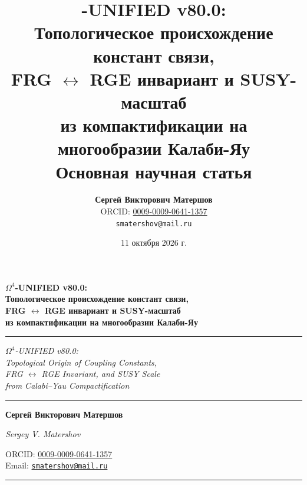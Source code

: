 \documentclass[11pt,a4paper]{article}
\title{
    \textbf{\Omtext-UNIFIED v80.0: \\[0.3em]
    Топологическое происхождение констант связи, \\
    FRG $\leftrightarrow$ RGE инвариант и SUSY-масштаб \\[0.3em]
    из компактификации на многообразии Калаби-Яу} \\[0.5em]
    \large Основная научная статья
}
\author{
    \textbf{Сергей Викторович Матершов} \\
    ORCID: \href{https://orcid.org/0009-0009-0641-1357}{0009-0009-0641-1357} \\
    \small \texttt{smatershov@mail.ru}
}
\date{11 октября 2026 г.}
\theoremstyle{definition}
\begin{document}

\begin{titlepage}
\centering

\vspace*{1.5cm}

{\LARGE\bfseries
$\Omega^4$-UNIFIED v80.0: \\[0.4em]
Топологическое происхождение констант связи, \\[0.3em]
FRG $\leftrightarrow$ RGE инвариант и SUSY-масштаб \\[0.3em]
из компактификации на многообразии Калаби-Яу
\par}

\vspace{0.6cm}
\rule{0.7\textwidth}{0.4pt}
\vspace{0.6cm}

{\large\itshape
$\Omega^4$-UNIFIED v80.0: \\[0.3em]
Topological Origin of Coupling Constants, \\[0.2em]
FRG $\leftrightarrow$ RGE Invariant, and SUSY Scale \\[0.2em]
from Calabi--Yau Compactification
\par}

\vspace{1.2cm}
\rule{0.5\textwidth}{0.4pt}
\vspace{1.2cm}

{\Large\bfseries
Сергей Викторович Матершов
\par}

\vspace{0.5cm}

{\large\itshape
Sergey V. Matershov
\par}

\vspace{0.8cm}

{\large
ORCID: \href{https://orcid.org/0009-0009-0641-1357}{0009-0009-0641-1357} \\[0.3em]
Email: \href{mailto:smatershov@mail.ru}{\texttt{smatershov@mail.ru}}
\par}

\vspace{1.2cm}
\rule{0.5\textwidth}{0.4pt}
\vspace{0.8cm}


\end{titlepage}
\end{document}
